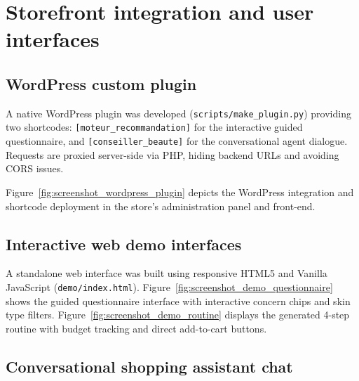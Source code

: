 \section{Storefront integration and user interfaces}

\subsection{WordPress custom plugin}

A native WordPress plugin was developed (\texttt{scripts/make\_plugin.py}) providing two shortcodes: \texttt{[moteur\_recommandation]} for the interactive guided questionnaire, and \texttt{[conseiller\_beaute]} for the conversational agent dialogue. Requests are proxied server-side via PHP, hiding backend URLs and avoiding CORS issues.

Figure~\ref{fig:screenshot_wordpress_plugin} depicts the WordPress integration and shortcode deployment in the store's administration panel and front-end.


\subsection{Interactive web demo interfaces}

A standalone web interface was built using responsive HTML5 and Vanilla JavaScript (\texttt{demo/index.html}). Figure~\ref{fig:screenshot_demo_questionnaire} shows the guided questionnaire interface with interactive concern chips and skin type filters. Figure~\ref{fig:screenshot_demo_routine} displays the generated 4-step routine with budget tracking and direct add-to-cart buttons.



\subsection{Conversational shopping assistant chat}

